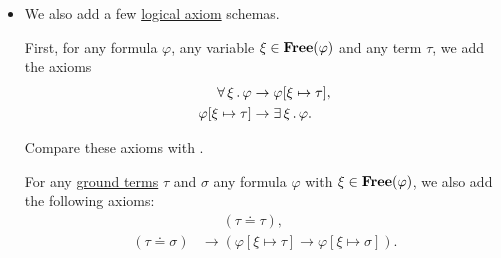 \begin{definition}
\begin{itemize}
    \item We also add a few \hyperref[def:logical_derivation_system/axioms]{logical axiom} schemas.

    \begin{thmenum}[resume=def:first_order_axiomatic_derivation_system]
       First, for any formula \( \varphi \), any variable \( \xi \in \operatorname{\mathbf{Free}}(\varphi) \) and any term \( \tau \), we add the axioms
      \begin{align}
        \forall \thinspace \xi \thinspace . \thinspace \varphi      &\rightarrow \varphi[\xi \mapsto \tau], \label{eq:def:first_order_axiomatic_derivation_system/axioms/terms/forall_elim} \\
        \varphi[\xi \mapsto \tau] &\rightarrow \exists \thinspace \xi \thinspace . \thinspace \varphi.      \label{eq:def:first_order_axiomatic_derivation_system/axioms/terms/exists_intro}
      \end{align}

      Compare these axioms with .

       For any \hyperref[def:first_order_syntax/ground_term]{ground terms} \( \tau \) and \( \sigma \) any formula \( \varphi \) with \( \xi \in \operatorname{\mathbf{Free}}(\varphi) \), we also add the following axioms:
      \begin{align}
                             &\phantom{{}\rightarrow{}} (\tau \doteq \tau), \label{eq:def:first_order_axiomatic_derivation_system/axioms/equality/reflexivity} \\
        (\tau \doteq \sigma) &\rightarrow (\varphi[\xi \mapsto \tau] \rightarrow \varphi[\xi \mapsto \sigma]) \label{eq:def:first_order_axiomatic_derivation_system/axioms/equality/subst}.
      \end{align}
    \end{thmenum}
  \end{itemize}
\end{definition}

